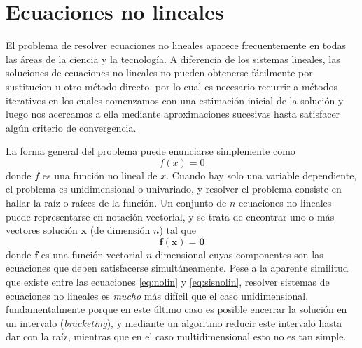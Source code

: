 \section{Ecuaciones no lineales}\label{sec:enolin}
El problema de resolver ecuaciones no lineales aparece frecuentemente en todas las áreas de la ciencia y la tecnología. A diferencia de los sistemas lineales, las soluciones de ecuaciones no lineales no pueden obtenerse fácilmente por sustitucion u otro método directo, por lo cual es necesario recurrir a métodos iterativos en los cuales comenzamos con una estimación inicial de la solución y luego nos acercamos a ella mediante aproximaciones sucesivas hasta satisfacer algún criterio de convergencia.

La forma general del problema puede enunciarse simplemente como
\begin{equation}\label{eq:nolin}
 f(x) = 0
\end{equation} 
donde $f$ es una función no lineal de $x$. Cuando hay solo una variable dependiente, el problema es unidimensional o univariado, y resolver el problema consiste en hallar la raíz o raíces de la función. Un conjunto de $n$ ecuaciones no lineales puede representarse en notación vectorial, y se trata de encontrar uno o más vectores solución $\bm{x}$ (de dimensión $n$) tal que
\begin{equation}\label{eq:sisnolin}
 \bm{f}(\bm{x}) = \bm{0}
\end{equation} 
donde $\bm{f}$ es una función vectorial $n$-dimensional cuyas componentes son las ecuaciones que deben satisfacerse simultáneamente. Pese a la aparente similitud que existe entre las ecuaciones \eqref{eq:nolin} y \eqref{eq:sisnolin}, resolver sistemas de ecuaciones no lineales es \textit{mucho} más difícil que el caso unidimensional, fundamentalmente porque en este último caso es posible encerrar la solución en un intervalo (\textit{bracketing}), y mediante un algoritmo reducir este intervalo hasta dar con la raíz, mientras que en el caso multidimensional esto no es tan simple.

